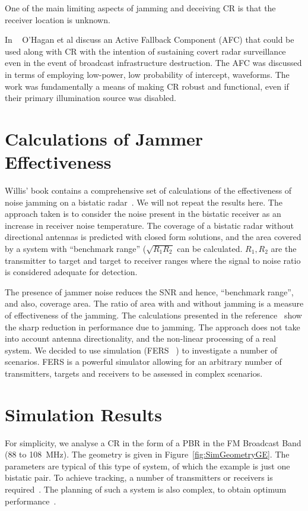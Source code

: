 \documentclass[conference]{IEEEtran}
\begin{document}
One of the main limiting aspects of jamming and deceiving CR is that
the receiver location is unknown.

In ~\cite{ohagan_irs} O'Hagan et al discuss an Active Fallback Component (AFC) that could be used along with CR with the intention of sustaining covert radar surveillance even in the event of broadcast infrastructure destruction. The AFC was discussed in terms of employing low-power, low probability of intercept, waveforms. The work was fundamentally a means of making CR robust and functional, even if their primary illumination source was disabled.   


\section{Calculations of Jammer Effectiveness}

Willis' book contains a comprehensive set of calculations of the effectiveness of noise jamming on a bistatic radar~\cite[Chapter 6, section 6.7]{willis:07}. We will not repeat the results here. The approach taken is to consider the noise present in the bistatic receiver as an increase in receiver noise temperature. The coverage of a bistatic radar without directional antennas is predicted with closed form solutions, and the area covered by a system with ``benchmark range'' ($\sqrt{R_1 R_2}$ can be calculated. $R_1, R_2$ are the transmitter to target and target to receiver ranges where the signal to noise ratio is considered adequate for detection.

The presence of jammer noise reduces the SNR and hence, ``benchmark range'', and also, coverage area. The ratio of area with and without jamming is a measure of effectiveness of the jamming. The calculations presented in the reference~\cite[Chapter 6, section 6.7]{willis:07} show the sharp reduction in performance due to jamming. The approach does not take into account antenna directionality, and the non-linear processing of a real system. We decided to use simulation (FERS~\cite{inggs:09a, Brooker:2008c} ) to investigate a number of scenarios. FERS is a powerful simulator allowing for an arbitrary number of transmitters, targets and receivers to be assessed in complex scenarios.

\section{Simulation Results}
For simplicity, we analyse a CR in the form of a PBR in the FM Broadcast Band (88 to 108~MHz). The geometry is given in Figure~\ref{fig:SimGeometryGE}. The parameters are typical of this type of system, of which the example is just one bistatic pair. To achieve tracking, a number of transmitters or receivers is required~\cite{maasdorp2014cramer}. The planning of such a system is also complex, to obtain optimum performance~\cite{inggs2014planning}.
\end{document}
